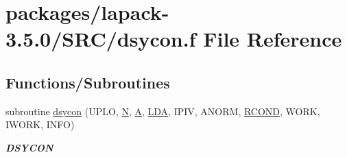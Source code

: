 \hypertarget{dsycon_8f}{}\section{packages/lapack-\/3.5.0/\+S\+R\+C/dsycon.f File Reference}
\label{dsycon_8f}
\subsection*{Functions/\+Subroutines}
\begin{DoxyCompactItemize}
\item 
subroutine \hyperlink{group__doubleSYcomputational_ga417acfa28a2839cb987363fa5fd5f2eb}{dsycon} (U\+P\+L\+O, \hyperlink{polmisc_8c_a0240ac851181b84ac374872dc5434ee4}{N}, \hyperlink{classA}{A}, \hyperlink{example__user_8c_ae946da542ce0db94dced19b2ecefd1aa}{L\+D\+A}, I\+P\+I\+V, A\+N\+O\+R\+M, \hyperlink{superlu__enum__consts_8h_af00a42ecad444bbda75cde1b64bd7e72a9b5c151728d8512307565994c89919d5}{R\+C\+O\+N\+D}, W\+O\+R\+K, I\+W\+O\+R\+K, I\+N\+F\+O)
\begin{DoxyCompactList}\small\item\em {\bfseries D\+S\+Y\+C\+O\+N} \end{DoxyCompactList}\end{DoxyCompactItemize}
